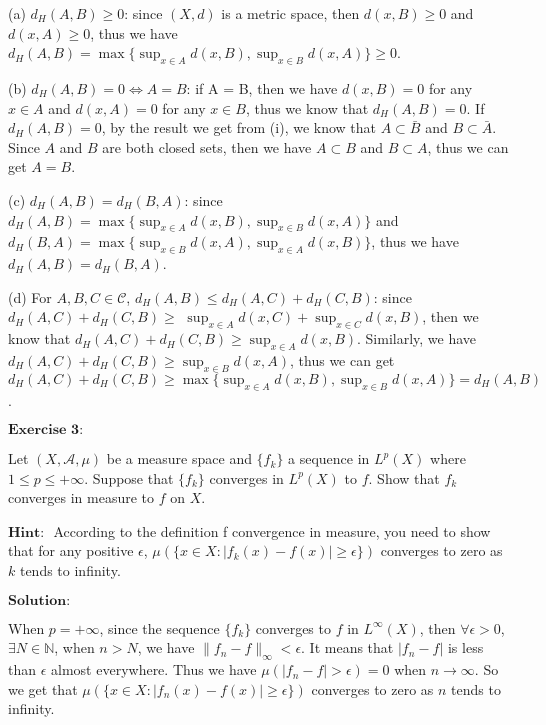 \documentclass[12pt,a4paper]{ctexart}
\begin{document}
(a) $d_{H}(A, B) \geq 0$: since $(X, d)$ is a metric space, then $d(x, B) \geq 0$ and $d(x, A) \geq 0$, thus we have $d_{H}(A, B) = \max \{\sup_{x \in A} d(x, B), \sup_{x \in B} d(x, A) \} \geq 0$.

(b) $d_{H}(A, B) = 0 \iff A = B$: if A = B, then we have $d(x, B) = 0$ for any $x \in A$ and $d(x, A) = 0$ for any $x \in B$, thus we know that $d_{H}(A, B) = 0$. If $d_{H}(A, B) = 0$, by the result we get from (i), we know that $A \subset \bar{B}$ and $B \subset \bar{A}$. Since $A$ and $B$ are both closed sets, then we have $A \subset B$ and $B \subset A$, thus we can get $A = B$.

(c) $d_{H}(A, B) = d_{H}(B, A)$: since $d_{H}(A, B) = \max \{\sup_{x \in A} d(x, B), \sup_{x \in B} d(x, A) \}$ and $d_{H}(B, A) = \max \{\sup_{x \in B} d(x, A), \sup_{x \in A} d(x, B) \}$, thus we have $d_{H}(A, B) = d_{H}(B, A)$.

(d) For $A, B, C \in \mathcal{C}$, $d_{H}(A, B) \leq d_{H}(A, C) + d_{H}(C, B)$: since $d_{H}(A, C) + d_{H}(C, B) \geq $ $\sup_{x \in A} d(x, C) + \sup_{x \in C} d(x, B)$, then we know that $d_{H}(A, C) + d_{H}(C, B) \geq \sup_{x \in A} d(x, B)$. Similarly, we have $d_{H}(A, C) + d_{H}(C, B) \geq \sup_{x \in B} d(x, A)$, thus we can get $d_{H}(A, C) + d_{H}(C, B) \geq \max \{\sup_{x \in A} d(x, B), \sup_{x \in B} d(x, A) \} = d_{H}(A, B)$.

\vspace{8pt}

$\textbf{Exercise 3:}$

Let $(X, \mathcal{A}, \mu)$ be a measure space and $\{f_{k}\}$ a sequence in $L^{p}(X)$ where $1 \leq p \leq + \infty$. Suppose that $\{f_{k}\}$ converges in $L^{p}(X)$ to $f$. Show that $f_{k}$ converges in measure to $f$ on $X$.

$\textbf{Hint: }$ According to the definition f convergence in measure, you need to show that for any positive $\epsilon$, $\mu(\{x \in X: |f_{k}(x) - f(x)| \geq \epsilon \})$ converges to zero as $k$ tends to infinity.

\vspace{8pt}
$\textbf{Solution:}$

When $p = + \infty$, since the sequence $\{f_{k}\}$ converges to $f$ in $L^{\infty} (X)$, then $\forall \epsilon > 0$, $\exists N \in \mathbb{N}$, when $n > N$, we have $\|f_{n} - f\|_{\infty} < \epsilon$. It means that $|f_{n} - f|$ is less than $\epsilon$ almost everywhere. Thus we have $\mu(|f_{n} - f| > \epsilon) = 0$ when $n \to \infty$. So we get that $\mu(\{x \in X: |f_{n}(x) - f(x)| \geq \epsilon \})$ converges to zero as $n$ tends to infinity.
\end{document}
